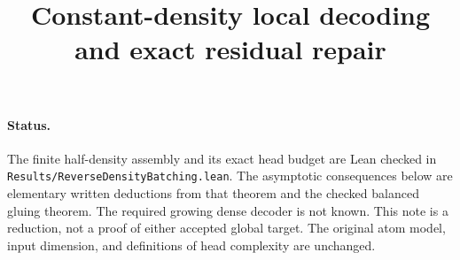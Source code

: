 \documentclass[11pt]{article}
\begin{document}
\title{Constant-density local decoding and exact residual repair}
\author{}\date{}\maketitle

\paragraph{Status.}
The finite half-density assembly and its exact head budget are Lean
checked in \texttt{Results/ReverseDensityBatching.lean}. The asymptotic
consequences below are elementary written deductions from that theorem
and the checked balanced gluing theorem. The required growing dense
decoder is not known. This note is a reduction, not a proof of either
accepted global target. The original atom model, input dimension, and
definitions of head complexity are unchanged.
\end{document}
